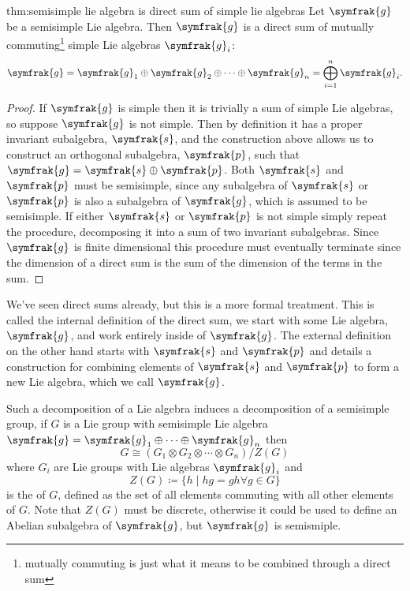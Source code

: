 \documentclass[fleqn]{NotesClass}
\renewcommand{\lie}[1]{\symfrak{#1}}
\newcommand{\isomorphic}{\cong}
\begin{document}
    \begin{thm}{}{thm:semisimple lie algebra is direct sum of simple lie algebras}
        Let \(\lie{g}\) be a semisimple Lie algebra.
        Then \(\lie{g}\) is a direct sum of mutually commuting\footnote{mutually commuting is just what it means to be combined through a direct sum} simple Lie algebras \(\lie{g}_i\):
        \begin{equation}
            \lie{g} = \lie{g}_1 \oplus \lie{g}_2 \oplus \dotsb \oplus \lie{g}_n = \bigoplus_{i=1}^n \lie{g}_i.
        \end{equation}
        \begin{proof}
            If \(\lie{g}\) is simple then it is trivially a sum of simple Lie algebras, so suppose \(\lie{g}\) is not simple.
            Then by definition it has a proper invariant subalgebra, \(\lie{s}\), and the construction above allows us to construct an orthogonal subalgebra, \(\lie{p}\), such that \(\lie{g} = \lie{s} \oplus \lie{p}\).
            Both \(\lie{s}\) and \(\lie{p}\) must be semisimple, since any subalgebra of \(\lie{s}\) or \(\lie{p}\) is also a subalgebra of \(\lie{g}\), which is assumed to be semisimple.
            If either \(\lie{s}\) or \(\lie{p}\) is not simple simply repeat the procedure, decomposing it into a sum of two invariant subalgebras.
            Since \(\lie{g}\) is finite dimensional this procedure must eventually terminate since the dimension of a direct sum is the sum of the dimension of the terms in the sum.
        \end{proof}
    \end{thm}
    
    We've seen direct sums already, but this is a more formal treatment.
    This is called the internal definition of the direct sum, we start with some Lie algebra, \(\lie{g}\), and work entirely inside of \(\lie{g}\).
    The external definition on the other hand starts with \(\lie{s}\) and \(\lie{p}\) and details a construction for combining elements of \(\lie{s}\) and \(\lie{p}\) to form a new Lie algebra, which we call \(\lie{g}\).
    
    Such a decomposition of a Lie algebra induces a decomposition of a semisimple group, if \(G\) is a Lie group with semisimple Lie algebra \(\lie{g} = \lie{g}_1 \oplus \dotsb \oplus \lie{g}_n\) then
    \begin{equation}
        G \isomorphic (G_1 \otimes G_2 \otimes \dotsb \otimes G_n) / Z(G)
    \end{equation}
    where \(G_i\) are Lie groups with Lie algebras \(\lie{g}_i\) and
    \begin{equation}
        Z(G) \coloneqq \{h \mid hg = gh \forall g \in G\}
    \end{equation}
    is the  of \(G\), defined as the set of all elements commuting with all other elements of \(G\).
    Note that \(Z(G)\) must be discrete, otherwise it could be used to define an Abelian subalgebra of \(\lie{g}\), but \(\lie{g}\) is semismiple.
    
\end{document}
